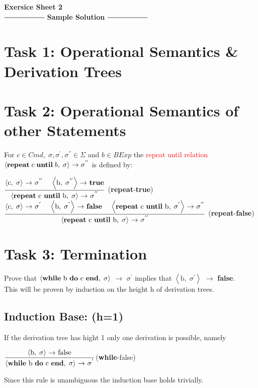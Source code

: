 \documentclass[12pt,a4paper]{article}
\newcommand{\eRelation}[2]{$\dfrac{\text{#1}}{\text{#2}}$}
\newcommand{\eState}[2]{$\left< \text{#1},\; \text{#2}\right>$}
\newcommand{\eRule}[3]{\eState{#1}{#2} $\rightarrow$ #3}
\begin{document}
	\begin{center}
		\huge\textbf{Exersice Sheet 2}\\[0.5cm]
	
		\Large
		$\mathrel{\vcenter{\hbox{\rule{2cm}{0.5pt}}}}$ \textbf{Sample 				Solution} $\mathrel{\vcenter{\hbox{\rule{2cm}{0.5pt}}}}$\\[1cm]
	\end{center}
\large
	\section*{Task 1: Operational Semantics & Derivation Trees}
	\section*{Task 2: Operational Semantics of other Statements}
		\indent\indent For $c\in Cmd,\; \sigma , \sigma ^{'}, \sigma ^{''} \in \Sigma$ and $b\in BExp$ the \textcolor{red}{repeat until relation}\\\indent $\left< \text{\textbf{repeat}}\; c\; \text{\textbf{until}}\; b,\; \sigma \right> \rightarrow \sigma ^{''}$ is defined by:\\
		
		\begin{center}
			\eRelation
				{\eRule{c}{$\sigma$}{$\sigma ^{''}$ \quad \eRule{b}{$\sigma ^{''}$}{\textbf{true}}}}
				{\eRule{\textbf{repeat} c \textbf{until} b}{$\sigma$}{$\sigma ^{''}$}}
			(\textbf{repeat}-\textbf{true})\\[0.75cm]
			\eRelation
				{\eRule{c}{$\sigma$}{$\sigma ^{'}$} \quad \eRule{b}{$\sigma ^{'}$}{\textbf{false}} \quad \eRule{\textbf{repeat} c \textbf{until} b}{$\sigma ^{'}$}{$\sigma ^{''}$}}
				{\eRule{\textbf{repeat} c \textbf{until} b}{$\sigma$}{$\sigma ^{''}$}}
			(\textbf{repeat}-\textbf{false})\\
		\end{center}
	\section*{Task 3: Termination}
		\indent\indent Prove that \eRule{\textbf{while} b \textbf{do} c \textbf{end}}{$\sigma$}{$\sigma ^{'}$} implies that \eRule{b}{$\sigma ^{'}$}{\textbf{false}}.\\
		\indent This will be proven by induction on the height h of derivation trees.\\
		\subsection*{Induction Base: (h=1)}
		\indent\indent If the derivation tree has hight 1 only one derivation is possible, namely\\
		\begin{center}
			\eRelation
				{\eRule{b}{$\sigma$}{false}}
				{\eRule{\textbf{while} b \textbf{do} c \textbf{end}}{$\sigma$}{$\sigma ^{'}$}}(\textbf{while}-false)
		\end{center}
		\indent\indent Since this rule is unambiguous the induction base holds trivially.\\
\end{document}
